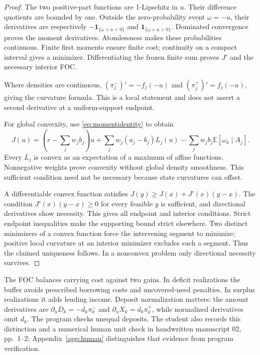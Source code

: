 \documentclass[11pt]{article}
\theoremstyle{definition}
\newcommand{\E}{\mathbb E}
\begin{document}
\begin{proof}
The two positive-part functions are 1-Lipschitz in $u$. Their difference quotients are bounded by one. Outside the zero-probability event $\omega=-u$, their derivatives are respectively $-\mathbf1_{\{\omega+u<0\}}$ and $\mathbf1_{\{\omega+u>0\}}$. Dominated convergence proves the moment derivatives. Atomlessness makes these probabilities continuous. Finite first moments ensure finite cost; continuity on a compact interval gives a minimizer. Differentiating the frozen finite sum proves $J'$ and the necessary interior FOC.

Where densities are continuous, $(\pi^-_j)'=-f_j(-u)$ and $(\pi^+_j)'=f_j(-u)$, giving the curvature formula. This is a local statement and does not assert a second derivative at a uniform-support endpoint.

For global convexity, use \eqref{eq:momentidentity} to obtain
\begin{equation}\label{eq:convexdecomposition}
 J(u)=\left(r-\sum_jw_jb_j\right)u+
 \sum_jw_j(a_j-b_j)L_j(u)-\sum_jw_jb_j\E[\omega_k\mid A_j].
\end{equation}
Every $L_j$ is convex as an expectation of a maximum of affine functions. Nonnegative weights prove convexity without global density smoothness. This sufficient condition need not be necessary because state curvatures can offset.

A differentiable convex function satisfies $J(y)\geq J(x)+J'(x)(y-x)$. The condition $J'(x)(y-x)\geq0$ for every feasible $y$ is sufficient, and directional derivatives show necessity. This gives all endpoint and interior conditions. Strict endpoint inequalities make the supporting bound strict elsewhere. Two distinct minimizers of a convex function force the intervening segment to minimize; positive local curvature at an interior minimizer excludes such a segment. Thus the claimed uniqueness follows. In a nonconvex problem only directional necessity survives.
\end{proof}

The FOC balances carrying cost against two gains. In deficit realizations the buffer avoids prescribed borrowing costs and uncovered-need penalties. In surplus realizations it adds lending income. Deposit normalization matters: the amount derivatives are $\partial_uD_k=-d_k\pi_k^-$ and $\partial_uX_k=d_k\pi_k^+$, while normalized derivatives omit $d_k$. The program checks unequal deposits. The student also records this distinction and a numerical human unit check in handwritten manuscript 02, pp.~1--2; Appendix~\ref{app:human} distinguishes that evidence from program verification.
\end{document}
